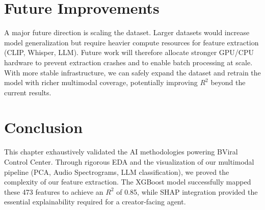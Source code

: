 \section{Future Improvements}
A major future direction is scaling the dataset. Larger datasets would increase model generalization but require heavier compute resources for feature extraction (CLIP, Whisper, LLM). Future work will therefore allocate stronger GPU/CPU hardware to prevent extraction crashes and to enable batch processing at scale. With more stable infrastructure, we can safely expand the dataset and retrain the model with richer multimodal coverage, potentially improving $R^2$ beyond the current results.
\section*{Conclusion}
{}
This chapter exhaustively validated the AI methodologies powering BViral Control Center. Through rigorous EDA and the visualization of our multimodal pipeline (PCA, Audio Spectrograms, LLM classification), we proved the complexity of our feature extraction. The XGBoost model successfully mapped these 473 features to achieve an $R^2$ of 0.85, while SHAP integration provided the essential explainability required for a creator-facing agent.